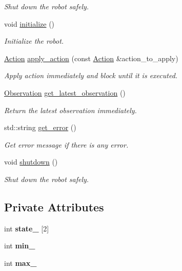 \begin{DoxyCompactItemize}
\begin{DoxyCompactList}\small\item\em Shut down the robot safely. \end{DoxyCompactList}\item 
void \hyperlink{classDriver_a81c0beb523fad80cd40cfcc6a6e3de2d}{initialize} ()
\begin{DoxyCompactList}\small\item\em Initialize the robot. \end{DoxyCompactList}\item 
\hyperlink{classAction}{Action} \hyperlink{classDriver_a0f8d51bef151ccc38a0cb7b226048e28}{apply\+\_\+action} (const \hyperlink{classAction}{Action} \&action\+\_\+to\+\_\+apply)
\begin{DoxyCompactList}\small\item\em Apply action immediately and block until it is executed. \end{DoxyCompactList}\item 
\hyperlink{classObservation}{Observation} \hyperlink{classDriver_afb09663997bffc5c694fb5aa8aca243a}{get\+\_\+latest\+\_\+observation} ()
\begin{DoxyCompactList}\small\item\em Return the latest observation immediately. \end{DoxyCompactList}\item 
std\+::string \hyperlink{classDriver_a6fb739b87c892c4102e838508855c0be}{get\+\_\+error} ()
\begin{DoxyCompactList}\small\item\em Get error message if there is any error. \end{DoxyCompactList}\item 
void \hyperlink{classDriver_a630fc9183eb419beb09b5828b4547b6d}{shutdown} ()\hypertarget{classDriver_a630fc9183eb419beb09b5828b4547b6d}{}\label{classDriver_a630fc9183eb419beb09b5828b4547b6d}

\begin{DoxyCompactList}\small\item\em Shut down the robot safely. \end{DoxyCompactList}\end{DoxyCompactItemize}
\subsection*{Private Attributes}
\begin{DoxyCompactItemize}
\item 
int {\bfseries state\+\_\+} \mbox{[}2\mbox{]}\hypertarget{classDriver_ac342821e039cd6e64c8227e5fd2f10c7}{}\label{classDriver_ac342821e039cd6e64c8227e5fd2f10c7}

\item 
int {\bfseries min\+\_\+}\hypertarget{classDriver_ae1f5333762d8c70fd5e8afc0314d3568}{}\label{classDriver_ae1f5333762d8c70fd5e8afc0314d3568}

\item 
int {\bfseries max\+\_\+}\hypertarget{classDriver_a9292f94b9df62ede6d983824ff79480c}{}\label{classDriver_a9292f94b9df62ede6d983824ff79480c}

\end{DoxyCompactItemize}
